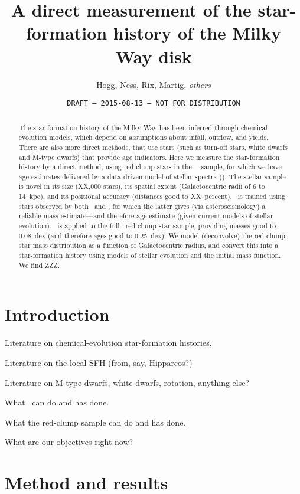\documentclass[12pt, preprint]{aastex}
\begin{document}
\title{A direct measurement of the star-formation history of the Milky Way disk}
\author{%
  Hogg,
  Ness,
  Rix,
  Martig,
  \emph{others}}
\date{\texttt{DRAFT --- 2015-08-13 --- NOT FOR DISTRIBUTION}}

\begin{abstract}
The star-formation history of the Milky Way has been inferred
through chemical evolution models, which depend on assumptions about
infall, outflow, and yields.
There are also more direct methods, that use stars (such as turn-off
stars, white dwarfs and M-type dwarfs) that provide age indicators.
Here we measure the star-formation history by a direct method, using
red-clump stars in the \sdss\ \apogee\ sample, for which we have age
estimates delivered by a data-driven model of stellar spectra (\tc).
The stellar sample is novel in its size (XX,000 stars), its spatial
extent (Galactocentric radii of 6 to 14~kpc), and its positional
accuracy (distances good to XX~percent).
\tc\ is trained using stars observed by both \apogee\ and \kepler, for
which the latter gives (via asteroseismology) a reliable mass
estimate---and therefore age estimate (given current models of stellar
evolution).
\tc\ is applied to the full \apogee\ red-clump star sample, providing
masses good to 0.08~dex (and therefore ages good to 0.25~dex).
We model (deconvolve) the red-clump-star mass distribution as a function
of Galactocentric radius, and convert this into a star-formation history
using models of stellar evolution and the initial mass function.
We find ZZZ.
\end{abstract}

\section{Introduction}

Literature on chemical-evolution star-formation histories.

Literature on the local SFH (from, say, Hipparcos?)

Literature on M-type dwarfs, white dwarfs, rotation, anything else?

What \tc\ can do and has done.

What the red-clump sample can do and has done.

What are our objectives right now?

\section{Method and results}
\end{document}
